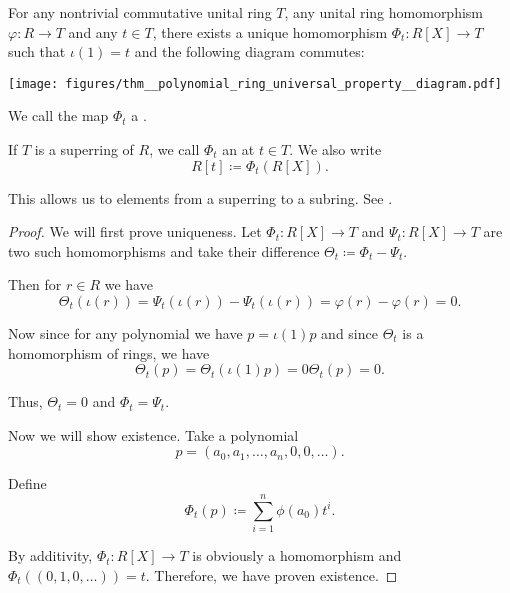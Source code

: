 \begin{proposition}\label{thm:polynomial_ring_universal_property}
  For any nontrivial commutative unital ring \( T \), any unital ring homomorphism \( \varphi: R \to T \) and any \( t \in T \), there exists a unique homomorphism \( \Phi_t: R[X] \to T \) such that \( \iota(1) = t \) and the following diagram commutes:

  \begin{alignedeq}\label{thm:polynomial_ring_universal_property/diagram}
    \texttt{[image: figures/thm\_\_polynomial\_ring\_universal\_property\_\_diagram.pdf]}
  \end{alignedeq}

  We call the map \( \Phi_t \) a .

  If \( T \) is a superring of \( R \), we call \( \Phi_t \) an  at \( t \in T \). We also write
  \begin{equation}
    R[t] \coloneqq \Phi_t(R[X]).
  \end{equation}

  This allows us to  elements from a superring to a subring. See .
\end{proposition}
\begin{proof}
  We will first prove uniqueness. Let \( \Phi_t: R[X] \to T \) and \( \Psi_t: R[X] \to T \) are two such homomorphisms and take their difference \( \Theta_t \coloneqq \Phi_t - \Psi_t \).

  Then for \( r \in R \) we have
  \begin{equation*}
    \Theta_t(\iota(r)) = \Psi_t(\iota(r)) - \Psi_t(\iota(r)) = \varphi(r) - \varphi(r) = 0.
  \end{equation*}

  Now since for any polynomial we have \( p = \iota(1) p \) and since \( \Theta_t \) is a homomorphism of rings, we have
  \begin{equation*}
    \Theta_t(p) = \Theta_t(\iota(1) p) = 0 \Theta_t(p) = 0.
  \end{equation*}

  Thus, \( \Theta_t = 0 \) and \( \Phi_t = \Psi_t \).

  Now we will show existence. Take a polynomial
  \begin{equation*}
    p = (a_0, a_1, \ldots, a_n, 0, 0, \ldots).
  \end{equation*}

  Define
  \begin{equation*}
    \Phi_t(p) \coloneqq \sum_{i=1}^n \phi(a_0) t^i.
  \end{equation*}

  By additivity, \( \Phi_t: R[X] \to T \) is obviously a homomorphism and \( \Phi_t((0, 1, 0, \ldots)) = t \). Therefore, we have proven existence.
\end{proof}


